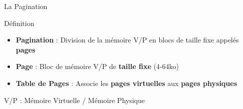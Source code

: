 \documentclass[8pt]{beamer}
\begin{document}
\begin{frame}{La Pagination}
    \begin{block}{D\'efinition}
        \begin{itemize}
            \item \textbf{Pagination} : Division de la mémoire V/P	en
                  blocs de taille fixe appelés \textbf{pages}
            \item \textbf{Page} : Bloc de mémoire V/P de \textbf{taille fixe}
                  (4-64ko)
            \item \textbf{Table de Pages} : Associe les \textbf{pages
                      virtuelles} aux \textbf{pages physiques}
        \end{itemize}
        V/P : Mémoire Virtuelle / Mémoire Physique
    \end{block}
\end{frame}
\end{document}
